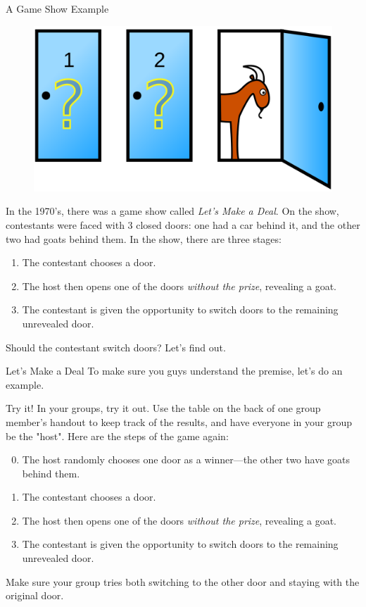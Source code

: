 \documentclass{beamer}
\begin{document}
\begin{frame}{A Game Show Example}
    \begin{figure}
        \centering
        \includegraphics[scale=.06]{montyhalldoors.png}
    \end{figure}
    In the 1970's, there was a game show called \textit{Let's Make a Deal}. On the show, contestants were faced with 3 closed doors: one had a car behind it, and the other two had goats behind them. In the show, there are three stages:
    
    \begin{enumerate}
        \item The contestant chooses a door.
        \item The host then opens one of the doors \textit{without the prize}, revealing a goat. 
        \item The contestant is given the opportunity to switch doors to the remaining unrevealed door.
    \end{enumerate}
    Should the contestant switch doors? Let's find out.
\end{frame}

\begin{frame}{Let's Make a Deal}
    To make sure you guys understand the premise, let's do an example. 
\end{frame}

\begin{frame}{Try it!}
    In your groups, try it out. Use the table on the back of one group member's handout to keep track of the results, and have everyone in your group be the "host". Here are the steps of the game again:
    
    \begin{enumerate}
        \setcounter{enumi}{-1}
        \item The host randomly chooses one door as a winner---the other two have goats behind them.
        \item The contestant chooses a door.
        \item The host then opens one of the doors \textit{without the prize}, revealing a goat. 
        \item The contestant is given the opportunity to switch doors to the remaining unrevealed door.
    \end{enumerate}
    
    Make sure your group tries both switching to the other door and staying with the original door.
    
\end{frame}
\end{document}
